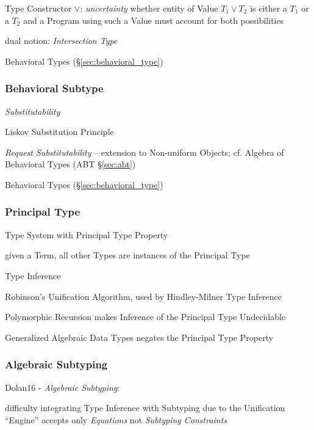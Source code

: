 Type Constructor $\vee$: \emph{uncertainty} whether entity of Value
$T_1 \vee T_2$ is either a $T_1$ or a $T_2$ and a Program using such a
Value must account for both possibilities


dual notion: \emph{Intersection Type}

\fist Behavioral Types (\S\ref{sec:behavioral_type})



\subsubsection{Behavioral Subtype}\label{sec:behavioral_subtype}

\emph{Substitutability}

Liskov Substitution Principle

\emph{Request Substitutability} -- extension to Non-uniform Objects;
cf. Algebra of Behavioral Types (ABT \S\ref{sec:abt})

\fist Behavioral Types (\S\ref{sec:behavioral_type})



\subsubsection{Principal Type}\label{sec:principal_type}

Type System with Principal Type Property

given a Term, all other Types are instances of the Principal Type

Type Inference

Robinson's Unification Algorithm, used by Hindley-Milner Type
Inference

Polymorphic Recursion makes Inference of the Principal Type Undecidable

Generalized Algebraic Data Types negates the Principal Type Property



\subsubsection{Algebraic Subtyping}\label{sec:algebraic_subtyping}

Dolan16 - \emph{Algebraic Subtyping}:

difficulty integrating Type Inference with Subtyping due to the
Unification ``Engine'' accepts only \emph{Equations} not
\emph{Subtyping Constraints}

